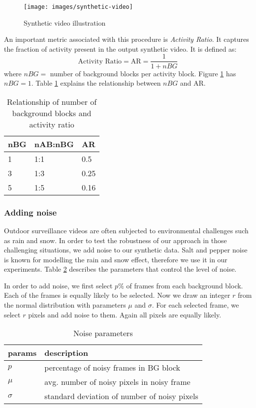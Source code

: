 \begin{figure}
    \centering
    \texttt{[image: images/synthetic-video]}
    \caption{Synthetic video illustration}
    \label{fig:synthetic-video}
\end{figure}

An important metric associated with this procedure is \textit{Activity Ratio}. It captures the fraction of activity present in the output synthetic video. It is defined as: 
$$ \text{Activity Ratio} = \text{AR} = \frac{1}{1+nBG} $$
where $nBG=$ number of background blocks per activity block. Figure \ref{fig:synthetic-video} has $nBG=1$. Table \ref{table:activity-ratio} explains the relationship between $nBG$ and AR. 


\begin{table}
\centering
\caption{Relationship of number of background blocks and activity ratio} \vspace{5pt}
\label{table:activity-ratio}
\begin{tabular}{@{}| l | l | l | @{}} \hline
nBG & nAB:nBG & AR   \\ \hline \hline
1   & 1:1     & 0.5  \\
3   & 1:3     & 0.25 \\
5   & 1:5     & 0.16 \\ \hline
\end{tabular}
\end{table}

\subsubsection{Adding noise}
Outdoor surveillance videos are often subjected to environmental challenges such as rain and snow. In order to test the robustness of our approach in those challenging situations, we add noise to our synthetic data. Salt and pepper noise \cite{marques2011practical} is known for modelling the rain and snow effect, therefore we use it in our experiments. 
Table \ref{table:noise-params} describes the parameters that control the level of noise. 

In order to add noise, we first select $p\%$ of frames from each background block. Each of the frames is equally likely to be selected. Now we draw an integer $r$ from the normal distribution with parameters $\mu$ and $\sigma$. For each selected frame, we select $r$ pixels and add noise to them. Again all pixels are equally likely. 

\begin{table}
\centering
\caption{Noise parameters}  \vspace{5pt}
\label{table:noise-params}
\begin{tabular}{|l|l|}
\hline
params & description                              \\ \hline \hline
$p$          & percentage of noisy frames in BG block  \\ 
$\mu$        & avg. number of noisy pixels in noisy frame     \\ 
$\sigma$     & standard deviation of number of noisy pixels     \\ \hline
\end{tabular}
\end{table}
